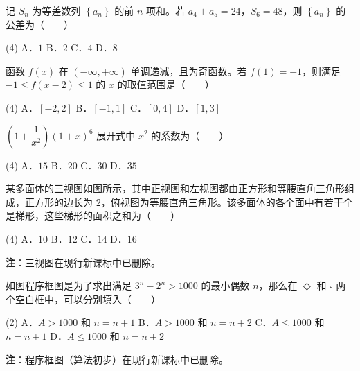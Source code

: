 记 $S_n$ 为等差数列 $\left\{a_n\right\}$ 的前 $n$ 项和。若 $a_4+a_5=24$，$S_6=48$，则 $\left\{a_n\right\}$ 的公差为（　　）

\begin{gkopts}(4)
\task A．$1$
\task B．$2$
\task C．$4$
\task D．$8$
\end{gkopts}

函数 $f(x)$ 在 $(-\infty,+\infty)$ 单调递减，且为奇函数。若 $f(1)=-1$，则满足 $-1\le f(x-2)\le1$ 的 $x$ 的取值范围是（　　）

\begin{gkopts}(4)
\task A．$[-2,2]$
\task B．$[-1,1]$
\task C．$[0,4]$
\task D．$[1,3]$
\end{gkopts}

$\left(1+\dfrac1{x^{2}}\right)(1+x)^{6}$ 展开式中 $x^{2}$ 的系数为（　　）

\begin{gkopts}(4)
\task A．$15$
\task B．$20$
\task C．$30$
\task D．$35$
\end{gkopts}

某多面体的三视图如图所示，其中正视图和左视图都由正方形和等腰直角三角形组成，正方形的边长为 $2$，俯视图为等腰直角三角形。该多面体的各个面中有若干个是梯形，这些梯形的面积之和为（　　）

\begin{center}\end{center}

\begin{gkopts}(4)
\task A．$10$
\task B．$12$
\task C．$14$
\task D．$16$
\end{gkopts}

\begin{gktip}
\textbf{注}：三视图在现行新课标中已删除。
\end{gktip}

如图程序框图是为了求出满足 $3^{n}-2^{n}>1000$ 的最小偶数 $n$，那么在 $\Diamond$ 和 $\square$ 两个空白框中，可以分别填入（　　）

\begin{center}\end{center}

\begin{gkopts}(2)
\task A．$A>1000$ 和 $n=n+1$
\task B．$A>1000$ 和 $n=n+2$
\task C．$A\le1000$ 和 $n=n+1$
\task D．$A\le1000$ 和 $n=n+2$
\end{gkopts}

\begin{gktip}
\textbf{注}：程序框图（算法初步）在现行新课标中已删除。
\end{gktip}

